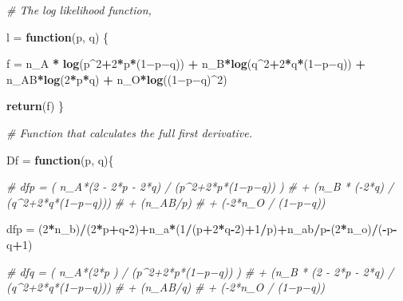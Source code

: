 \documentclass[]{article}
\newenvironment{Shaded}{\begin{snugshade}}{\end{snugshade}}
\newcommand{\KeywordTok}[1]{\textcolor[rgb]{0.13,0.29,0.53}{\textbf{#1}}}
\newcommand{\DecValTok}[1]{\textcolor[rgb]{0.00,0.00,0.81}{#1}}
\newcommand{\StringTok}[1]{\textcolor[rgb]{0.31,0.60,0.02}{#1}}
\newcommand{\CommentTok}[1]{\textcolor[rgb]{0.56,0.35,0.01}{\textit{#1}}}
\newcommand{\ControlFlowTok}[1]{\textcolor[rgb]{0.13,0.29,0.53}{\textbf{#1}}}
\newcommand{\OperatorTok}[1]{\textcolor[rgb]{0.81,0.36,0.00}{\textbf{#1}}}
\newcommand{\NormalTok}[1]{#1}
\begin{document}
\begin{Shaded}
\begin{Highlighting}[]
\CommentTok{# The log likelihood function,}

\NormalTok{l =}\StringTok{ }\ControlFlowTok{function}\NormalTok{(p, q) \{}

\NormalTok{  f =}\StringTok{ }\NormalTok{n_A }\OperatorTok{*}\StringTok{ }\KeywordTok{log}\NormalTok{(p}\OperatorTok{^}\DecValTok{2}\OperatorTok{+}\DecValTok{2}\OperatorTok{*}\NormalTok{p}\OperatorTok{*}\NormalTok{(}\DecValTok{1}\NormalTok{−p−q)) }\OperatorTok{+}\StringTok{ }\NormalTok{n_B}\OperatorTok{*}\KeywordTok{log}\NormalTok{(q}\OperatorTok{^}\DecValTok{2}\OperatorTok{+}\DecValTok{2}\OperatorTok{*}\NormalTok{q}\OperatorTok{*}\NormalTok{(}\DecValTok{1}\NormalTok{−p−q)) }\OperatorTok{+}\StringTok{ }\NormalTok{n_AB}\OperatorTok{*}\KeywordTok{log}\NormalTok{(}\DecValTok{2}\OperatorTok{*}\NormalTok{p}\OperatorTok{*}\NormalTok{q) }\OperatorTok{+}\StringTok{ }\NormalTok{n_O}\OperatorTok{*}\KeywordTok{log}\NormalTok{((}\DecValTok{1}\NormalTok{−p−q)}\OperatorTok{^}\DecValTok{2}\NormalTok{)}

  \KeywordTok{return}\NormalTok{(f)}
\NormalTok{\}}



\CommentTok{# Function that calculates the full first derivative. }

\NormalTok{Df =}\StringTok{ }\ControlFlowTok{function}\NormalTok{(p, q)\{}
  
  \CommentTok{# dfp =   ( n_A*(2 - 2*p - 2*q) / (p^2+2*p*(1−p−q)) )   }
  \CommentTok{#       + (n_B * (-2*q) / (q^2+2*q*(1−p−q))) }
  \CommentTok{#       + (n_AB/p) }
  \CommentTok{#       + (-2*n_O / (1−p−q))}
  
\NormalTok{  dfp =}\StringTok{ }\NormalTok{(}\DecValTok{2}\OperatorTok{*}\NormalTok{n_b)}\OperatorTok{/}\NormalTok{(}\DecValTok{2}\OperatorTok{*}\NormalTok{p}\OperatorTok{+}\NormalTok{q}\OperatorTok{-}\DecValTok{2}\NormalTok{)}\OperatorTok{+}\NormalTok{n_a}\OperatorTok{*}\NormalTok{(}\DecValTok{1}\OperatorTok{/}\NormalTok{(p}\OperatorTok{+}\DecValTok{2}\OperatorTok{*}\NormalTok{q}\OperatorTok{-}\DecValTok{2}\NormalTok{)}\OperatorTok{+}\DecValTok{1}\OperatorTok{/}\NormalTok{p)}\OperatorTok{+}\NormalTok{n_ab}\OperatorTok{/}\NormalTok{p}\OperatorTok{-}\NormalTok{(}\DecValTok{2}\OperatorTok{*}\NormalTok{n_o)}\OperatorTok{/}\NormalTok{(}\OperatorTok{-}\NormalTok{p}\OperatorTok{-}\NormalTok{q}\OperatorTok{+}\DecValTok{1}\NormalTok{)}
  
  
  \CommentTok{# dfq =   ( n_A*(2*p ) / (p^2+2*p*(1−p−q)) )   }
  \CommentTok{#       + (n_B * (2 - 2*p - 2*q) / (q^2+2*q*(1−p−q))) }
  \CommentTok{#       + (n_AB/q) }
  \CommentTok{#       + (-2*n_O / (1−p−q))}
  

\end{Highlighting}
\end{Shaded}
\end{document}
